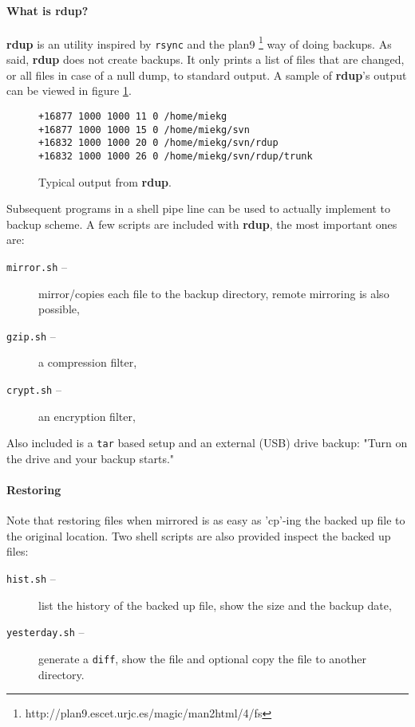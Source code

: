 \documentclass[a4, 10pt]{article}
\newcommand{\rdup}{\textbf{rdup}}
\newcommand{\cmd}[1]{\texttt{#1}}
\begin{document}
\paragraph{What is \rdup?}
\rdup{} is an utility inspired by \cmd{rsync} and the 
plan9 \footnote{http://plan9.escet.urjc.es/magic/man2html/4/fs} 
way of doing backups. As said, \rdup{} does not create backups. It only
prints a list of files that are changed, or all files in case of a null
dump, to standard output. A sample of \rdup's output can be viewed in
figure \ref{fig1:rdup}.

\begin{figure}[h!]
\begin{verbatim}
+16877 1000 1000 11 0 /home/miekg
+16877 1000 1000 15 0 /home/miekg/svn
+16832 1000 1000 20 0 /home/miekg/svn/rdup
+16832 1000 1000 26 0 /home/miekg/svn/rdup/trunk
\end{verbatim}
\caption{Typical output from \rdup.}
\label{fig1:rdup}
\end{figure}

Subsequent programs in a shell pipe line can be used to actually
implement to backup scheme. A few scripts are included with \rdup, 
the most important ones are:
\begin{description}
        \item[\cmd{mirror.sh} --]{
                mirror/copies each file to the backup directory, remote 
                mirroring is also possible,}
        \item[\cmd{gzip.sh} --]{
                a compression filter,}
        \item[\cmd{crypt.sh} --]{
                an encryption filter,}
\end{description}

Also included is a \cmd{tar} based setup and an external (USB) drive
backup: "Turn on the drive and your backup starts."

\paragraph{Restoring}
Note that restoring files when mirrored is as easy as 'cp'-ing the
backed up file to the original location. Two shell scripts are
also provided inspect the backed up files:
\begin{description}
        \item[\cmd{hist.sh} --]{
                list the history of the backed up file, show the size
                and the backup date,}
        \item[\cmd{yesterday.sh} --]{
                generate a \cmd{diff}, show the file and optional copy 
                the file to another directory.}
\end{description}
\end{document}

